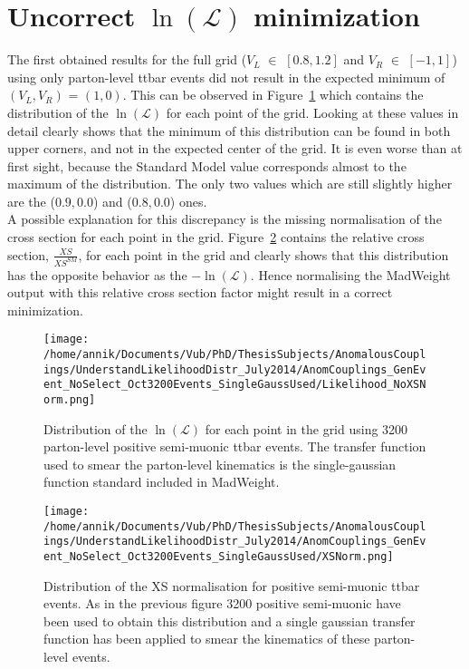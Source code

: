 \section{Uncorrect $\ln(\mathcal{L})$ minimization}
The first obtained results for the full grid ($V_L$ $\in$ $[0.8,1.2]$ and $V_R$ $\in$ $[-1,1]$) using only parton-level ttbar events did not result in the expected minimum of $(V_L,V_R)$ = $(1, 0)$. This can be observed in Figure~\ref{fig::Likelihood} which contains the distribution of the $\ln(\mathcal{L})$ for each point of the grid. Looking at these values in detail clearly shows that the minimum of this distribution can be found in both upper corners, and not in the expected center of the grid. It is even worse than at first sight, because the Standard Model value corresponds almost to the maximum of the distribution. The only two values which are still slightly higher are the ($0.9,0.0$) and ($0.8,0.0$) ones.\\
A possible explanation for this discrepancy is the missing normalisation of the cross section for each point in the grid. Figure~\ref{fig::XS} contains the relative cross section, $\frac{XS}{XS^{SM}}$, for each point in the grid and clearly shows that this distribution has the opposite behavior as the $-\ln(\mathcal{L})$. Hence normalising the MadWeight output with this relative cross section factor might result in a correct minimization.\\
\begin{figure}[htb!]
 \centering
 \texttt{[image: /home/annik/Documents/Vub/PhD/ThesisSubjects/AnomalousCouplings/UnderstandLikelihoodDistr\_July2014/AnomCouplings\_GenEvent\_NoSelect\_Oct3200Events\_SingleGaussUsed/Likelihood\_NoXSNorm.png]}
 \caption{Distribution of the $\ln(\mathcal{L})$ for each point in the grid using 3200 parton-level positive semi-muonic ttbar events. The transfer function used to smear the parton-level kinematics is the single-gaussian function standard included in MadWeight.}
 \label{fig::Likelihood}
\end{figure}

\begin{figure}
  \texttt{[image: /home/annik/Documents/Vub/PhD/ThesisSubjects/AnomalousCouplings/UnderstandLikelihoodDistr\_July2014/AnomCouplings\_GenEvent\_NoSelect\_Oct3200Events\_SingleGaussUsed/XSNorm.png]}
 \caption{Distribution of the XS normalisation for positive semi-muonic ttbar events. As in the previous figure 3200 positive semi-muonic have been used to obtain this distribution and a single gaussian transfer function has been applied to smear the kinematics of these parton-level events.}
 \label{fig::XS}
\end{figure}


